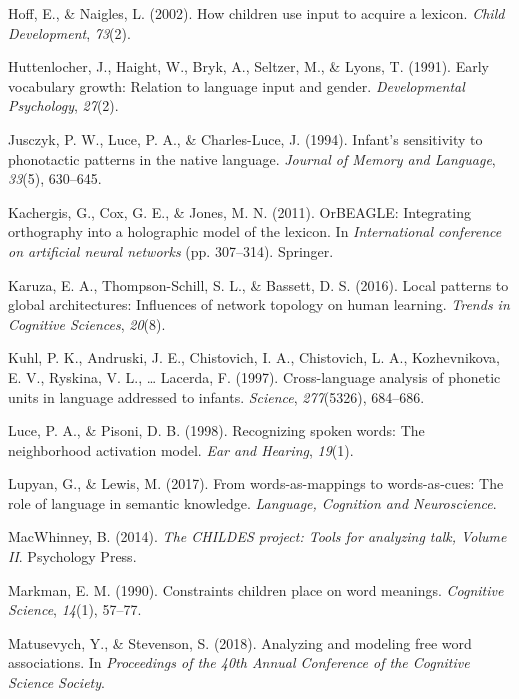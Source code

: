 \documentclass[english,,man,floatsintext]{apa6}
\begin{document}
\leavevmode\hypertarget{ref-hoff2002}{}%
Hoff, E., \& Naigles, L. (2002). How children use input to acquire a lexicon. \emph{Child Development}, \emph{73}(2).

\leavevmode\hypertarget{ref-huttenlocher1991}{}%
Huttenlocher, J., Haight, W., Bryk, A., Seltzer, M., \& Lyons, T. (1991). Early vocabulary growth: Relation to language input and gender. \emph{Developmental Psychology}, \emph{27}(2).

\leavevmode\hypertarget{ref-jusczyk1994}{}%
Jusczyk, P. W., Luce, P. A., \& Charles-Luce, J. (1994). Infant's sensitivity to phonotactic patterns in the native language. \emph{Journal of Memory and Language}, \emph{33}(5), 630--645.

\leavevmode\hypertarget{ref-kachergis2011}{}%
Kachergis, G., Cox, G. E., \& Jones, M. N. (2011). OrBEAGLE: Integrating orthography into a holographic model of the lexicon. In \emph{International conference on artificial neural networks} (pp. 307--314). Springer.

\leavevmode\hypertarget{ref-karuza2016}{}%
Karuza, E. A., Thompson-Schill, S. L., \& Bassett, D. S. (2016). Local patterns to global architectures: Influences of network topology on human learning. \emph{Trends in Cognitive Sciences}, \emph{20}(8).

\leavevmode\hypertarget{ref-kuhl1997}{}%
Kuhl, P. K., Andruski, J. E., Chistovich, I. A., Chistovich, L. A., Kozhevnikova, E. V., Ryskina, V. L., \ldots{} Lacerda, F. (1997). Cross-language analysis of phonetic units in language addressed to infants. \emph{Science}, \emph{277}(5326), 684--686.

\leavevmode\hypertarget{ref-luce1998}{}%
Luce, P. A., \& Pisoni, D. B. (1998). Recognizing spoken words: The neighborhood activation model. \emph{Ear and Hearing}, \emph{19}(1).

\leavevmode\hypertarget{ref-lupyan2017}{}%
Lupyan, G., \& Lewis, M. (2017). From words-as-mappings to words-as-cues: The role of language in semantic knowledge. \emph{Language, Cognition and Neuroscience}.

\leavevmode\hypertarget{ref-macwhinney2014}{}%
MacWhinney, B. (2014). \emph{The CHILDES project: Tools for analyzing talk, Volume II}. Psychology Press.

\leavevmode\hypertarget{ref-markman90}{}%
Markman, E. M. (1990). Constraints children place on word meanings. \emph{Cognitive Science}, \emph{14}(1), 57--77.

\leavevmode\hypertarget{ref-matusevych2018}{}%
Matusevych, Y., \& Stevenson, S. (2018). Analyzing and modeling free word associations. In \emph{Proceedings of the 40th Annual Conference of the Cognitive Science Society}.
\end{document}
